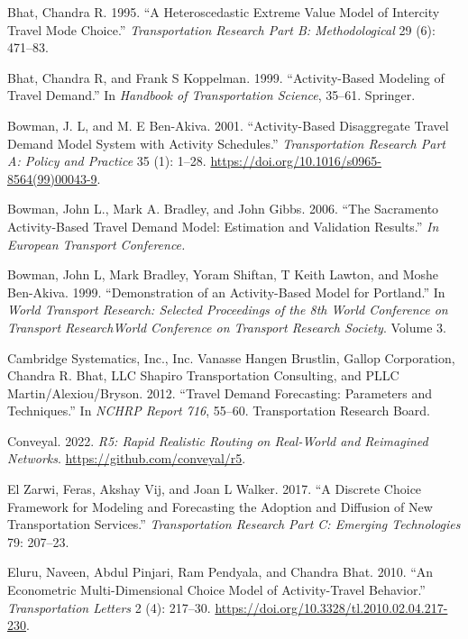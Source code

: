 \documentclass[12pt, oneside, openright]{byuthesis}
\newlength{\cslhangindent}
\newlength{\cslentryspacingunit} %
\newenvironment{CSLReferences}[2] %
 {%
  \setlength{\parindent}{0pt}
  \ifodd #1
  \let\oldpar\par
  \def\par{\hangindent=\cslhangindent\oldpar}
  \fi
  \setlength{\parskip}{#2\cslentryspacingunit}
 }%
 {}
\begin{document}
\begin{CSLReferences}{1}{0}
\leavevmode{}%
Bhat, Chandra R. 1995. {``A Heteroscedastic Extreme Value Model of Intercity Travel Mode Choice.''} \emph{Transportation Research Part B: Methodological} 29 (6): 471--83.

\leavevmode{}%
Bhat, Chandra R, and Frank S Koppelman. 1999. {``Activity-Based Modeling of Travel Demand.''} In \emph{Handbook of Transportation Science}, 35--61. Springer.

\leavevmode{}%
Bowman, J. L, and M. E Ben-Akiva. 2001. {``Activity-Based Disaggregate Travel Demand Model System with Activity Schedules.''} \emph{Transportation Research Part A: Policy and Practice} 35 (1): 1--28. \url{https://doi.org/10.1016/s0965-8564(99)00043-9}.

\leavevmode{}%
Bowman, John L., Mark A. Bradley, and John Gibbs. 2006. {``The Sacramento Activity-Based Travel Demand Model: Estimation and Validation Results.''} \emph{In European Transport Conference.}

\leavevmode{}%
Bowman, John L, Mark Bradley, Yoram Shiftan, T Keith Lawton, and Moshe Ben-Akiva. 1999. {``Demonstration of an Activity-Based Model for Portland.''} In \emph{World Transport Research: Selected Proceedings of the 8th World Conference on Transport ResearchWorld Conference on Transport Research Society}. Volume 3.

\leavevmode{}%
Cambridge Systematics, Inc., Inc. Vanasse Hangen Brustlin, Gallop Corporation, Chandra R. Bhat, LLC Shapiro Transportation Consulting, and PLLC Martin/Alexiou/Bryson. 2012. {``Travel Demand Forecasting: Parameters and Techniques.''} In \emph{NCHRP Report 716}, 55--60. Transportation Research Board.

\leavevmode{}%
Conveyal. 2022. \emph{R5: Rapid Realistic Routing on Real-World and Reimagined Networks}. \url{https://github.com/conveyal/r5}.

\leavevmode{}%
El Zarwi, Feras, Akshay Vij, and Joan L Walker. 2017. {``A Discrete Choice Framework for Modeling and Forecasting the Adoption and Diffusion of New Transportation Services.''} \emph{Transportation Research Part C: Emerging Technologies} 79: 207--23.

\leavevmode{}%
Eluru, Naveen, Abdul Pinjari, Ram Pendyala, and Chandra Bhat. 2010. {``An Econometric Multi-Dimensional Choice Model of Activity-Travel Behavior.''} \emph{Transportation Letters} 2 (4): 217--30. \url{https://doi.org/10.3328/tl.2010.02.04.217-230}.


\end{CSLReferences}
\end{document}
